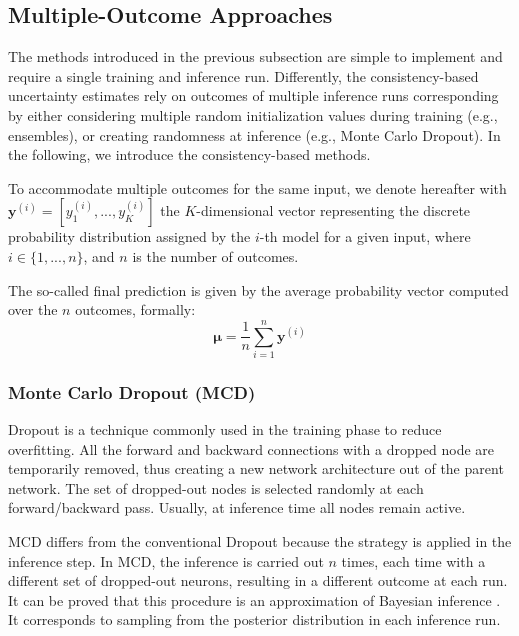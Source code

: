 


\subsection{Multiple-Outcome Approaches}

The methods introduced in the previous subsection are simple to implement and require a single training and inference run. Differently, the consistency-based uncertainty estimates rely on outcomes of multiple inference runs corresponding by either considering multiple random initialization values during training (e.g., ensembles), or creating randomness at inference (e.g., Monte Carlo Dropout). In the following, we introduce the consistency-based methods.

To accommodate multiple outcomes for the same input, we denote hereafter with $\textbf{y}^{(i)}=[ y_1^{(i)},..., y_K^{(i)}]$ the $K$-dimensional vector representing the discrete probability distribution assigned by the $i$-th model for a given input, where $i \in \{1,...,n\}$, and $n$ is the number of outcomes.

The so-called final prediction is given by the average probability vector computed over the $n$ outcomes, formally:
 \begin{equation} \label{eq:FinalPrediction}
 \boldsymbol{\mu}
 =\frac{1}{n}\sum_{i=1}^{n}{\textbf{y}^{(i)}}
 \end{equation}

\bigskip
\noindent
\subsubsection{Monte Carlo Dropout (MCD)}

Dropout is a technique commonly used in the training phase to reduce overfitting. All the forward and backward connections with a dropped node are temporarily removed, thus creating a new network architecture out of the parent network. The set of dropped-out nodes is selected randomly at each forward/backward pass. Usually, at inference time all nodes remain active. 

MCD differs from the conventional Dropout because the strategy is applied in the inference step. In MCD, the inference is carried out $n$ times, each time with a different set of dropped-out neurons, resulting in a different outcome at each run. 
 It can be proved that this procedure is an approximation of Bayesian inference \cite{gal2016dropout}. It corresponds to sampling from the posterior distribution in each inference run.  %

